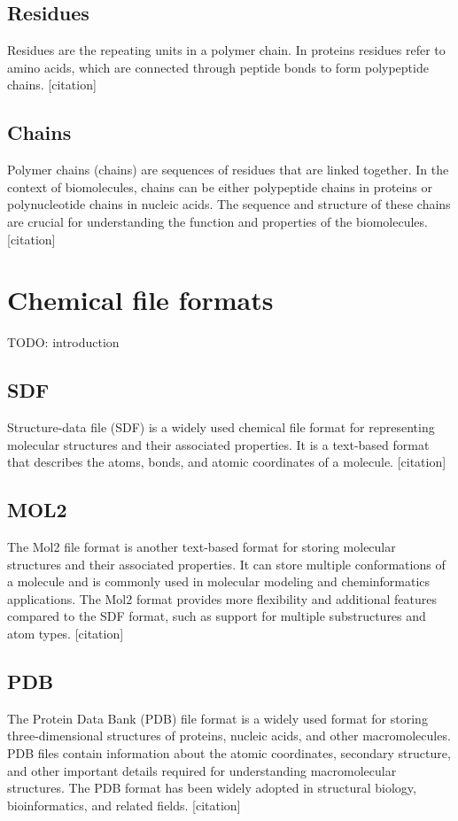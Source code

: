 \documentclass[
  digital,     %
  oneside,     %
  nosansbold,  %
  nocolorbold, %
  lof,         %
  lot,         %
]{fithesis4}
\begin{document}
\subsection{Residues}
Residues are the repeating units in a polymer chain. In proteins residues refer to amino acids, which are connected through peptide bonds to form polypeptide chains. [citation]

\subsection{Chains}
Polymer chains (chains) are sequences of residues that are linked together. In the context of biomolecules, chains can be either polypeptide chains in proteins or polynucleotide chains in nucleic acids. The sequence and structure of these chains are crucial for understanding the function and properties of the biomolecules. [citation]

\section{Chemical file formats}
TODO: introduction

\subsection{SDF}
Structure-data file (SDF) is a widely used chemical file format for representing molecular structures and their associated properties. It is a text-based format that describes the atoms, bonds, and atomic coordinates of a molecule.  [citation]

\subsection{MOL2}
The Mol2 file format is another text-based format for storing molecular structures and their associated properties. It can store multiple conformations of a molecule and is commonly used in molecular modeling and cheminformatics applications. The Mol2 format provides more flexibility and additional features compared to the SDF format, such as support for multiple substructures and atom types. [citation]

\subsection{PDB}
The Protein Data Bank (PDB) file format is a widely used format for storing three-dimensional structures of proteins, nucleic acids, and other macromolecules. PDB files contain information about the atomic coordinates, secondary structure, and other important details required for understanding macromolecular structures. The PDB format has been widely adopted in structural biology, bioinformatics, and related fields. [citation]
\end{document}
